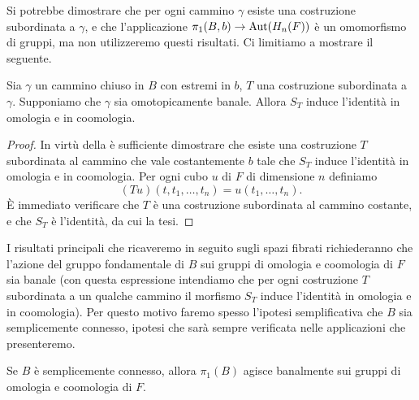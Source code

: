 Si potrebbe dimostrare che per ogni cammino $\gamma$ esiste una costruzione subordinata a $\gamma$, e che l'applicazione $\pi_1(B,b)\to\operatorname{Aut}(H_n(F))$ è un omomorfismo di gruppi, ma non utilizzeremo questi risultati.
Ci limitiamo a mostrare il seguente.
\begin{corollary}
Sia $\gamma$ un cammino chiuso in $B$ con estremi in $b$, $T$ una costruzione subordinata a $\gamma$. Supponiamo che $\gamma$ sia omotopicamente banale. Allora $S_T$ induce l'identità in omologia e in coomologia.
\end{corollary}
\begin{proof}
In virtù della  è sufficiente dimostrare che esiste una costruzione $T$ subordinata al cammino che vale costantemente $b$ tale che $S_T$ induce l'identità in omologia e in coomologia. Per ogni cubo $u$ di $F$ di dimensione $n$ definiamo
$$
(Tu)(t,t_1,\ldots,t_n)=u(t_1,\ldots,t_n).
$$
È immediato verificare che $T$ è una costruzione subordinata al cammino costante, e che $S_T$ è l'identità, da cui la tesi.
\end{proof}

I risultati principali che ricaveremo in seguito sugli spazi fibrati richiederanno che l'azione del gruppo fondamentale di $B$ sui gruppi di omologia e coomologia di $F$ sia banale (con questa espressione intendiamo che per ogni costruzione $T$ subordinata a un qualche cammino il morfismo $S_T$ induce l'identità in omologia e in coomologia). Per questo motivo faremo spesso l'ipotesi semplificativa che $B$ sia semplicemente connesso, ipotesi che sarà sempre verificata nelle applicazioni che presenteremo.

\begin{corollary}
Se $B$ è semplicemente connesso, allora $\pi_1(B)$ agisce banalmente sui gruppi di omologia e coomologia di $F$.
\end{corollary}

